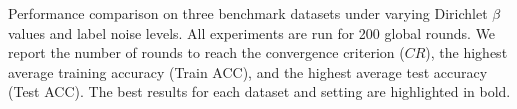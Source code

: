 \documentclass[lettersize,journal]{IEEEtran}
\begin{document}
\begin{table}[t]
\centering
\caption{Performance comparison on three benchmark datasets under varying Dirichlet $\beta$ values and label noise levels. All experiments are run for 200 global rounds. We report the number of rounds to reach the convergence criterion ($CR$), the highest average training accuracy (Train ACC), and the highest average test accuracy (Test ACC). The best results for each dataset and setting are highlighted in bold.}


\end{table}
\end{document}
